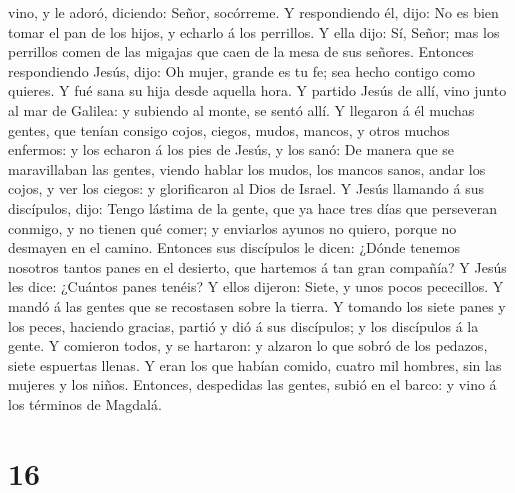 vino, y le adoró, diciendo: Señor, socórreme.  Y
respondiendo él, dijo: No es bien tomar el pan de los hijos, y echarlo á
los perrillos.  Y ella dijo: Sí, Señor; mas los perrillos
comen de las migajas que caen de la mesa de sus señores. 
Entonces respondiendo Jesús, dijo: Oh mujer, grande es tu fe; sea hecho
contigo como quieres. Y fué sana su hija desde aquella hora.
 Y partido Jesús de allí, vino junto al mar de Galilea: y
subiendo al monte, se sentó allí.  Y llegaron á él muchas
gentes, que tenían consigo cojos, ciegos, mudos, mancos, y otros muchos
enfermos: y los echaron á los pies de Jesús, y los sanó: 
De manera que se maravillaban las gentes, viendo hablar los mudos, los
mancos sanos, andar los cojos, y ver los ciegos: y glorificaron al Dios
de Israel.  Y Jesús llamando á sus discípulos, dijo: Tengo
lástima de la gente, que ya hace tres días que perseveran conmigo, y no
tienen qué comer; y enviarlos ayunos no quiero, porque no desmayen en el
camino.  Entonces sus discípulos le dicen: ¿Dónde tenemos
nosotros tantos panes en el desierto, que hartemos á tan gran compañía?
 Y Jesús les dice: ¿Cuántos panes tenéis? Y ellos dijeron:
Siete, y unos pocos pececillos.  Y mandó á las gentes que
se recostasen sobre la tierra.  Y tomando los siete panes y
los peces, haciendo gracias, partió y dió á sus discípulos; y los
discípulos á la gente.  Y comieron todos, y se hartaron: y
alzaron lo que sobró de los pedazos, siete espuertas llenas.
 Y eran los que habían comido, cuatro mil hombres, sin las
mujeres y los niños.  Entonces, despedidas las gentes,
subió en el barco: y vino á los términos de Magdalá.

\hypertarget{section-15}{%
\section{16}\label{section-15}}

